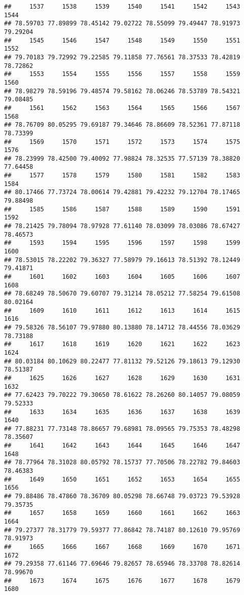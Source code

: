 \documentclass[
]{article}
\begin{document}
\begin{verbatim}
##     1537     1538     1539     1540     1541     1542     1543     1544 
## 78.59703 77.89899 78.45142 79.02722 78.55099 79.49447 78.91973 79.29204 
##     1545     1546     1547     1548     1549     1550     1551     1552 
## 79.70183 79.72992 79.22585 79.11858 77.76561 78.37533 78.42819 78.72862 
##     1553     1554     1555     1556     1557     1558     1559     1560 
## 78.98279 78.59196 79.48574 79.58162 78.06246 78.53789 78.54321 79.08485 
##     1561     1562     1563     1564     1565     1566     1567     1568 
## 78.76709 80.05295 79.69187 79.34646 78.86609 78.52361 77.87118 78.73399 
##     1569     1570     1571     1572     1573     1574     1575     1576 
## 78.23999 78.42500 79.40092 77.98824 78.32535 77.57139 78.38820 77.64458 
##     1577     1578     1579     1580     1581     1582     1583     1584 
## 80.17466 77.73724 78.00614 79.42881 79.42232 79.12704 78.17465 79.88498 
##     1585     1586     1587     1588     1589     1590     1591     1592 
## 78.21425 79.78094 78.97928 77.61140 78.03099 78.03086 78.67427 78.46573 
##     1593     1594     1595     1596     1597     1598     1599     1600 
## 78.53015 78.22202 79.36327 77.58979 79.16613 78.51392 78.12449 79.41871 
##     1601     1602     1603     1604     1605     1606     1607     1608 
## 78.68249 78.50670 79.60707 79.31214 78.05212 77.58254 79.61508 80.02164 
##     1609     1610     1611     1612     1613     1614     1615     1616 
## 79.58326 78.56107 79.97880 80.13880 78.14712 78.44556 78.03629 78.73188 
##     1617     1618     1619     1620     1621     1622     1623     1624 
## 80.03184 80.10629 80.22477 77.81132 79.52126 79.18613 79.12930 78.51387 
##     1625     1626     1627     1628     1629     1630     1631     1632 
## 77.62423 79.70222 79.30650 78.61622 78.26260 80.14057 79.08059 79.52333 
##     1633     1634     1635     1636     1637     1638     1639     1640 
## 77.88231 77.73148 78.86657 79.68981 78.09565 79.75353 78.48298 78.35607 
##     1641     1642     1643     1644     1645     1646     1647     1648 
## 78.77964 78.31028 80.05792 78.15737 77.70506 78.22782 79.84603 78.46383 
##     1649     1650     1651     1652     1653     1654     1655     1656 
## 79.88486 78.47860 78.36709 80.05298 78.66748 79.03723 79.53928 79.35735 
##     1657     1658     1659     1660     1661     1662     1663     1664 
## 79.27377 78.31779 79.59377 77.86842 78.74187 80.12610 79.95769 78.91973 
##     1665     1666     1667     1668     1669     1670     1671     1672 
## 79.29358 77.61146 77.69646 79.82657 78.65946 78.33708 78.82614 78.99670 
##     1673     1674     1675     1676     1677     1678     1679     1680 

\end{verbatim}
\end{document}
